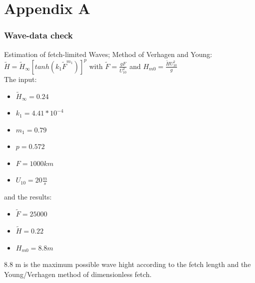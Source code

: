 \chapter{Appendix A}

 \subsection{Wave-data check}
 
Estimation of fetch-limited Waves; Method of Verhagen and Young: \\
$ \tilde{H}=\tilde{H}_{\infty}[tanh(k_1 \tilde{F}^{m_1})]^p $ with $ \tilde{F}= \frac{g F}{U_{10}^2} $ and $H_{m0} = \frac{\tilde{H} U_{10}^2}{g} $ \\
The input:
\begin{itemize}
\item $\tilde{H}_{\infty}= 0.24 $
\item $k_1= 4.41*10^{-4} $
\item $ m_1= 0.79 $
\item $p= 0.572 $
\item $F= 1000 km $
\item $U_{10}= 20 \frac{m}{s} $
\end{itemize}
 and the results:
 \begin{itemize}
 \item $\tilde{F}=25000 $
 \item $\tilde{H}= 0.22 $
 \item $H_{m0}= 8.8 m $
 \end{itemize}
 8.8 m is the maximum possible wave hight according to the fetch length and the Young/Verhagen method of dimensionless fetch.
 
